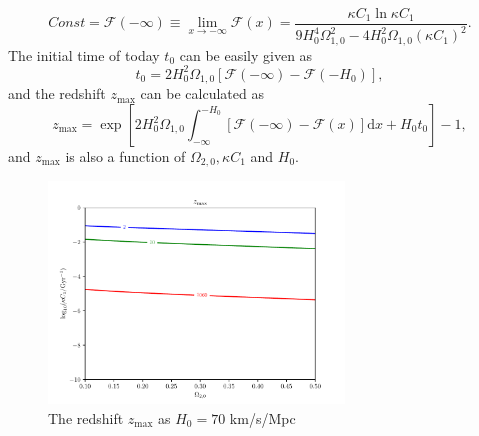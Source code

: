 \documentclass[twocolumn]{aastex631}
\begin{document}
   \begin{equation}
      Const=\mathcal{F}(-\infty)\equiv\lim_{x\to-\infty}\mathcal{F}(x)=
      \frac{\kappa C_1\ln\kappa C_1}{9H_0^4\Omega_{1,0}^2-4H_0^2\Omega_{1,0}(\kappa C_1)^2}.
   \end{equation}
   The initial time of today $t_0$ can be easily given as
   \begin{equation}
      t_0=2H_0^2\Omega_{1,0}[\mathcal{F}(-\infty)-\mathcal{F}(-H_0)],
   \end{equation}
   and the redshift $z_{\max}$ can be calculated as
   \begin{equation}
      z_{\max}=\exp\left[2H_0^2\Omega_{1,0}\int_{-\infty}^{-H_0}[\mathcal{F}(-\infty)
      -\mathcal{F}(x)]\mathrm{d}x+H_0t_0\right]-1,
   \end{equation}
   and $z_{\max}$ is also a function of $\Omega_{2,0}, \kappa C_1$ and $H_0$.
   \begin{figure}
      \centering
      \includegraphics[width=0.7\textwidth]{zmax.pdf}
      \caption{The redshift $z_{\max}$ as $H_0=70$ km/s/Mpc}
   \end{figure}



\end{document}
